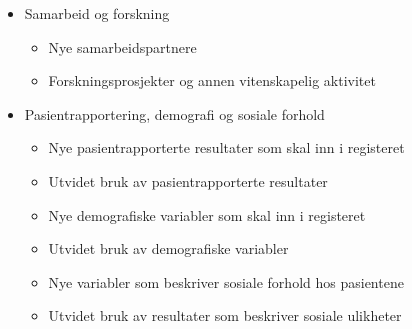 \documentclass[norsk, a4paper, twocolumn]{report}
\begin{document}
\begin{itemize}
  \item Samarbeid og forskning
    \begin{itemize}
      \item Nye samarbeidspartnere
      \item Forskningsprosjekter og annen vitenskapelig aktivitet
    \end{itemize}
  \item Pasientrapportering, demografi og sosiale forhold
    \begin{itemize}
      \item Nye pasientrapporterte resultater som skal inn i registeret
      \item Utvidet bruk av pasientrapporterte resultater
      \item Nye demografiske variabler som skal inn i registeret
      \item Utvidet bruk av demografiske variabler
      \item Nye variabler som beskriver sosiale forhold hos pasientene
      \item Utvidet bruk av resultater som beskriver sosiale ulikheter
    \end{itemize}
\end{itemize}



\end{document}
